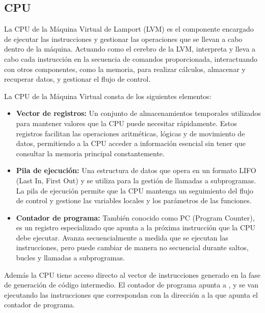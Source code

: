 \subsection{CPU}\label{subsubsec:CPULVM}
La CPU de la Máquina Virtual de Lamport (LVM) es el componente encargado de ejecutar las instrucciones y gestionar las operaciones que se llevan a cabo dentro de la máquina. Actuando como el cerebro de la LVM, interpreta y lleva a cabo cada instrucción en la secuencia de comandos proporcionada, interactuando con otros componentes, como la memoria, para realizar cálculos, almacenar y recuperar datos, y gestionar el flujo de control.

\vspace{0.5cm}

\noindent
La CPU de la Máquina Virtual consta de los siguientes elementos:
\begin{itemize}
    \item \textbf{Vector de registros:} Un conjunto de almacenamientos temporales utilizados para mantener valores que la CPU puede necesitar rápidamente. Estos registros facilitan las operaciones aritméticas, lógicas y de movimiento de datos, permitiendo a la CPU acceder a información esencial sin tener que consultar la memoria principal constantemente.
    
    \item \textbf{Pila de ejecución:} Una estructura de datos que opera en un formato LIFO (Last In, First Out) y se utiliza para la gestión de llamadas a subprogramas. La pila de ejecución permite que la CPU mantenga un seguimiento del flujo de control y gestione las variables locales y los parámetros de las funciones.
    
    \item \textbf{Contador de programa:} También conocido como PC (Program Counter), es un registro especializado que apunta a la próxima instrucción que la CPU debe ejecutar. Avanza secuencialmente a medida que se ejecutan las instrucciones, pero puede cambiar de manera no secuencial durante saltos, bucles y llamadas a subprogramas.
\end{itemize}

Además la CPU tiene acceso directo al vector de instrucciones generado en la fase de generación de código intermedio. El contador de programa apunta a , y se van ejecutando las instrucciones que correspondan con la dirección a la que apunta el contador de programa.


